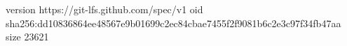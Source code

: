 version https://git-lfs.github.com/spec/v1
oid sha256:dd10836864ee48567e9b01699c2ec84cbae7455f2f9081b6c2e3c97f34fb47aa
size 23621
